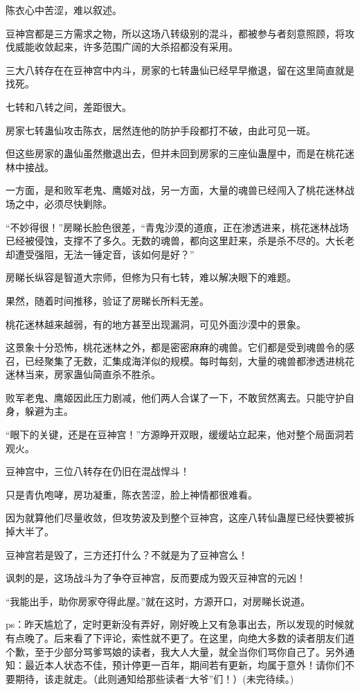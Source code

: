 \begin{this_body}
陈衣心中苦涩，难以叙述。

豆神宫都是三方需求之物，所以这场八转级别的混斗，都被参与者刻意照顾，将攻伐威能收敛起来，许多范围广阔的大杀招都没有采用。

三大八转存在在豆神宫中内斗，房家的七转蛊仙已经早早撤退，留在这里简直就是找死。

七转和八转之间，差距很大。

房家七转蛊仙攻击陈衣，居然连他的防护手段都打不破，由此可见一斑。

但这些房家的蛊仙虽然撤退出去，但并未回到房家的三座仙蛊屋中，而是在桃花迷林中接战。

一方面，是和败军老鬼、鹰姬对战，另一方面，大量的魂兽已经闯入了桃花迷林战场之中，必须尽快剿除。

“不妙得很！”房睇长脸色很差，“青鬼沙漠的道痕，正在渗透进来，桃花迷林战场已经被侵蚀，支撑不了多久。无数的魂兽，都向这里赶来，杀是杀不尽的。大长老却遭受强阻，无法一锤定音，该如何是好？”

房睇长纵容是智道大宗师，但修为只有七转，难以解决眼下的难题。

果然，随着时间推移，验证了房睇长所料无差。

桃花迷林越来越弱，有的地方甚至出现漏洞，可见外面沙漠中的景象。

这景象十分恐怖，桃花迷林之外，都是密密麻麻的魂兽。它们都是受到魂兽令的感召，已经聚集了无数，汇集成海洋似的规模。每时每刻，大量的魂兽都渗透进桃花迷林当来，房家蛊仙简直杀不胜杀。

败军老鬼、鹰姬因此压力剧减，他们两人合谋了一下，不敢贸然离去。只能守护自身，躲避为主。

“眼下的关键，还是在豆神宫！”方源睁开双眼，缓缓站立起来，他对整个局面洞若观火。

豆神宫中，三位八转存在仍旧在混战悍斗！

只是青仇咆哮，房功凝重，陈衣苦涩，脸上神情都很难看。

因为就算他们尽量收敛，但攻势波及到整个豆神宫，这座八转仙蛊屋已经快要被拆掉大半了。

豆神宫若是毁了，三方还打什么？不就是为了豆神宫么！

讽刺的是，这场战斗为了争夺豆神宫，反而要成为毁灭豆神宫的元凶！

“我能出手，助你房家夺得此屋。”就在这时，方源开口，对房睇长说道。

ps：昨天尴尬了，定时更新没有弄好，刚好晚上又有急事出去，所以发现的时候就有点晚了。后来看了下评论，索性就不更了。在这里，向绝大多数的读者朋友们道个歉，至于少部分骂爹骂娘的读者，我大人大量，就全当你们骂你自己了。另外通知：最近本人状态不佳，预计停更一百年，期间若有更新，均属于意外！请你们不要期待，该走就走。（此则通知给那些读者“大爷”们！）(未完待续。)

\end{this_body}

